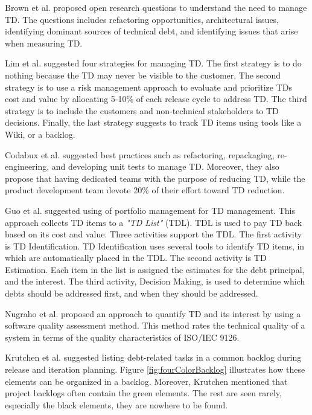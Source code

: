 Brown et al.\cite{foser076-brown} proposed open research questions to understand the need to manage TD. The questions includes refactoring opportunities, architectural issues, identifying dominant sources of technical debt, and identifying issues that arise when measuring TD.

Lim et al.\cite{lim-taksande} suggested four strategies for managing TD. The first strategy is to do nothing because the TD may never be visible to the customer. The second strategy is to use a risk management approach to evaluate and prioritize TDs cost and value by allocating 5-10\% of each release cycle to address TD. The third strategy is to include the customers and non-technical stakeholders to TD decisions. Finally, the last strategy suggests to track TD items using tools like a Wiki, or a backlog.

Codabux et al.\cite{p8-codabux} suggested best practices such as refactoring, repackaging, re-engineering, and developing unit tests to manage TD. Moreover, they also propose that having dedicated teams with the purpose of reducing TD, while the product development team devote 20\% of their effort toward TD reduction.
	
Guo et al.\cite{p31-guo} suggested using of portfolio management for TD management. This approach collects TD items to a \textit{"TD List"} (TDL). TDL is used to pay TD back based on its cost and value. Three activities support the TDL. The first activity is TD Identification. TD Identification uses several tools to identify TD items, in which are automatically placed in the TDL. The second activity is TD Estimation. Each item in the list is assigned the estimates for the debt principal, and the interest. The third activity, Decision Making, is used to determine which debts should be addressed first, and when they should be addressed.

Nugraho et al.\cite{p1-nugraho} proposed an approach to quantify TD and its interest by using a software quality assessment method. This method rates the technical quality of a system in terms of the quality characteristics of ISO/IEC 9126. 

Krutchen et al.\cite{krutchen} suggested listing debt-related tasks in a common backlog during release and iteration planning. Figure \ref{fig:fourColorBacklog} illustrates how these elements can be organized in a backlog. Moreover, Krutchen mentioned that project backlogs often contain the green elements. The rest are seen rarely, especially the black elements, they are nowhere to be found.


